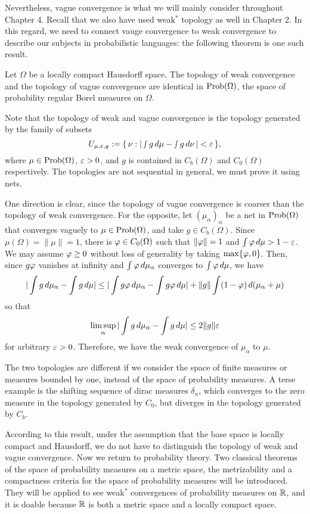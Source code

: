 \documentclass{../../small}
\begin{document}
Nevertheless, vague convergence is what we will mainly consider throughout Chapter 4.
Recall that we also have used weak$^*$ topology as well in Chapter 2.
In this regard, we need to connect vauge convergence to weak convergence to describe our subjects in probabilistic languages: the following theorem is one such result.

\begin{thm}
Let $\Omega$ be a locally compact Hausdorff space.
The topology of weak convergence and the topology of vague convergence are identical in $\operatorname{Prob}(\Omega)$, the space of probability regular Borel measures on $\Omega$.
\end{thm}

Note that the topology of weak and vague convergence is the topology generated by the family of subsets
\[U_{\mu,\varepsilon,g}:=\{\,\nu:|\smallint g\,d\mu-\smallint g\,d\nu\,|<\varepsilon\,\},\]
where $\mu\in\operatorname{Prob}(\Omega)$, $\varepsilon>0$, and $g$ is contained in $C_b(\Omega)$ and $C_0(\Omega)$ respectively.
The topologies are not sequential in general, we must prove it using nets.

\begin{pf}
One direction is clear, since the topology of vague convergence is coarser than the topology of weak convergence.
For the opposite, let $(\mu_\alpha)_\alpha$ be a net in $\operatorname{Prob}(\Omega)$ that converges vaguely to $\mu\in\operatorname{Prob}(\Omega)$, and take $g\in C_b(\Omega)$.
Since $\mu(\Omega)=\|\mu\|=1$, there is $\varphi\in C_0(\Omega)$ such that $\|\varphi\|=1$ and $\int\varphi\,d\mu>1-\varepsilon$.
We may assume $\varphi\ge0$ without loss of generality by taking $\max\{\varphi,0\}$.
Then, since $g\varphi$ vanishes at infinity and $\int\varphi\,d\mu_\alpha$ converges to $\int\varphi\,d\mu$, we have
\[|\int g\,d\mu_\alpha-\int g\,d\mu|\le|\int g\varphi\,d\mu_\alpha-\int g\varphi\,d\mu|+\|g\|\int(1-\varphi)\,d(\mu_\alpha+\mu)\]
so that
\[\limsup_\alpha|\int g\,d\mu_\alpha-\int g\,d\mu|\le2\|g\|\varepsilon\]
for arbitrary $\varepsilon>0$.
Therefore, we have the weak convergence of $\mu_\alpha$ to $\mu$.
\end{pf}
\begin{ex}
The two topologies are different if we consider the space of finite measures or measures bounded by one, instead of the space of probability measures.
A terse example is the shifting sequence of dirac measures $\delta_n$, which converges to the zero measure in the topology generated by $C_0$, but diverges in the topology generated by $C_b$.
\end{ex}

According to this result, under the assumption that the base space is locally compact and Hausdorff, we do not have to distinguish the topology of weak and vague convergence.
Now we return to probability theory.
Two classical theorems of the space of probability measures on a metric space, the metrizability and a compactness criteria for the space of probability measures will be introduced.
They will be applied to see weak$^*$ convergences of probability measures on $\mathbb{R}$, and it is doable because $\mathbb{R}$ is both a metric space and a locally compact space.
\end{document}
